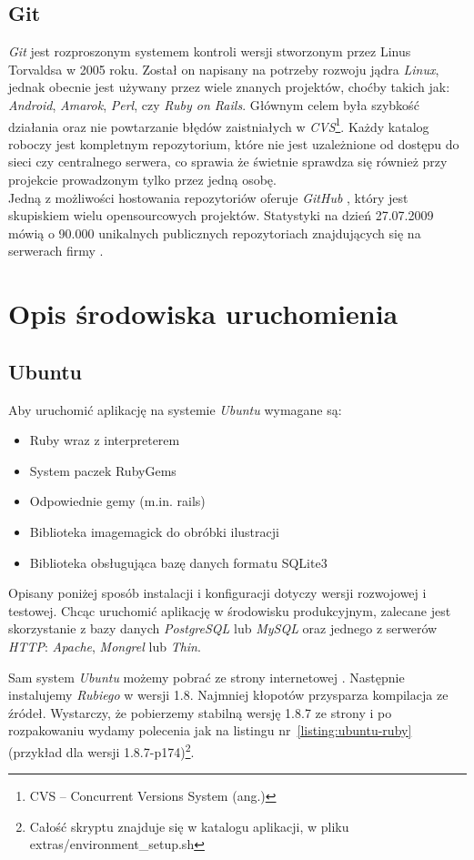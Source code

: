 \documentclass[12pt,twoside]{report}
\begin{document}
\section{Git}
\emph{Git} jest rozproszonym systemem kontroli wersji stworzonym przez Linus Torvaldsa w 2005 roku.
Został on napisany na potrzeby rozwoju jądra \emph{Linux}, jednak obecnie jest używany
przez wiele znanych projektów, choćby takich jak: \emph{Android}, \emph{Amarok}, \emph{Perl},
czy \emph{Ruby on Rails}. Głównym celem była szybkość działania oraz nie powtarzanie błędów
zaistniałych w \emph{CVS}\footnote{CVS -- Concurrent Versions System (ang.)}.
Każdy katalog roboczy jest kompletnym repozytorium, które nie jest uzależnione od dostępu
do sieci czy centralnego serwera, co sprawia że świetnie sprawdza się również przy projekcie
prowadzonym tylko przez jedną osobę.\\
Jedną z możliwości hostowania repozytoriów oferuje \emph{GitHub} \cite{github}, który jest
skupiskiem wielu opensourcowych projektów. Statystyki na dzień 27.07.2009 mówią o 90.000
unikalnych publicznych repozytoriach znajdujących się na serwerach firmy \cite{github-statistics}.


\cleardoublepage
\chapter{Opis środowiska uruchomienia}
\section{Ubuntu}
Aby uruchomić aplikację na systemie \emph{Ubuntu} wymagane są:
\begin{itemize}
  \item{Ruby wraz z interpreterem}
  \item{System paczek RubyGems}
  \item{Odpowiednie gemy (m.in. rails)}
  \item{Biblioteka imagemagick do obróbki ilustracji}
  \item{Biblioteka obsługująca bazę danych formatu SQLite3}
\end{itemize}


Opisany poniżej sposób instalacji i konfiguracji dotyczy wersji rozwojowej i testowej.
Chcąc uruchomić aplikację w środowisku produkcyjnym, zalecane jest skorzystanie z bazy
danych \emph{PostgreSQL} lub \emph{MySQL} oraz jednego z serwerów \emph{HTTP}:
\emph{Apache}, \emph{Mongrel} lub \emph{Thin}.


Sam system \emph{Ubuntu} możemy pobrać ze strony internetowej \cite{ubuntu}.
Następnie instalujemy \emph{Rubiego} w wersji 1.8. Najmniej kłopotów przysparza kompilacja ze
źródeł. Wystarczy, że pobierzemy stabilną wersję 1.8.7 ze strony \cite{ruby-package} i po
rozpakowaniu wydamy polecenia jak na listingu nr~\ref{listing:ubuntu-ruby} (przykład dla
wersji 1.8.7-p174)\footnote{Całość skryptu znajduje się w katalogu aplikacji, w pliku
extras/environment\_setup.sh}.
\end{document}
